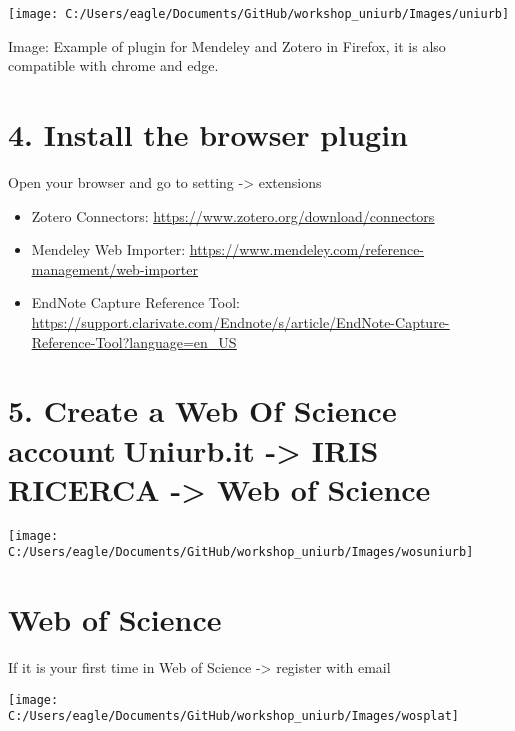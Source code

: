 \documentclass[
]{article}
\begin{document}
\begin{center}\texttt{[image: C:/Users/eagle/Documents/GitHub/workshop\_uniurb/Images/uniurb]} \end{center}

Image: Example of plugin for Mendeley and Zotero in Firefox, it is also
compatible with chrome and edge.

\hypertarget{install-the-browser-plugin}{%
\section{4. Install the browser
plugin}\label{install-the-browser-plugin}}

Open your browser and go to setting -\textgreater{} extensions

\begin{itemize}
\item
  Zotero Connectors:
  \href{https://www.zotero.org/download/connectors}{\uline{https://www.zotero.org/download/connectors}}
\item
  Mendeley Web Importer:
  \href{https://www.mendeley.com/reference-management/web-importer}{\uline{https://www.mendeley.com/reference-management/web-importer}}
\item
  EndNote Capture Reference Tool:
  \href{https://support.clarivate.com/Endnote/s/article/EndNote-Capture-Reference-Tool?language=en_US}{\uline{https://support.clarivate.com/Endnote/s/article/EndNote-Capture-Reference-Tool?language=en\_US}}
\end{itemize}

\hypertarget{create-a-web-of-science-account-uniurb.it---iris-ricerca---web-of-science}{%
\section{5. Create a Web Of Science accountUniurb.it -\textgreater{}
IRIS RICERCA -\textgreater{} Web of
Science}\label{create-a-web-of-science-account-uniurb.it---iris-ricerca---web-of-science}}

\begin{center}\texttt{[image: C:/Users/eagle/Documents/GitHub/workshop\_uniurb/Images/wosuniurb]} \end{center}

\hypertarget{web-of-science}{%
\section{Web of Science}\label{web-of-science}}

If it is your first time in Web of Science -\textgreater{} register with
email

\begin{center}\texttt{[image: C:/Users/eagle/Documents/GitHub/workshop\_uniurb/Images/wosplat]} \end{center}
\end{document}
